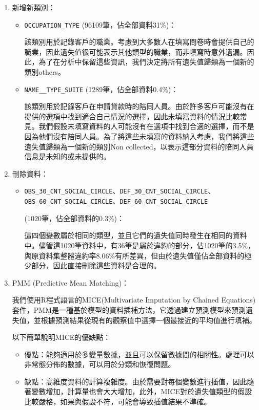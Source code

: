 \documentclass[12pt, a4paper]{article}
\begin{document}
\begin{enumerate}
\item 新增新類別：
\begin{itemize}

\item \verb|OCCUPATION_TYPE| (96109筆，佔全部資料31\%)：

該類別用於記錄客戶的職業。考慮到大多數人在填寫問卷時會提供自己的職業，因此遺失值很可能表示其他類型的職業，而非填寫時意外遺漏。因此，為了在分析中保留這些資訊，我們決定將所有遺失值歸類為一個新的類別others。

\item \verb|NAME__TYPE_SUITE| (1289筆，佔全部資料0.4\%)：

該類別用於記錄客戶在申請貸款時的陪同人員。由於許多客戶可能沒有在提供的選項中找到適合自己情況的選擇，因此未填寫資料的情況比較常見。我們假設未填寫資料的人可能沒有在選項中找到合適的選擇，而不是因為他們沒有陪同人員。為了將這些未填寫的資料納入考慮，我們將這些遺失值歸類為一個新的類別Non collected，以表示這部分資料的陪同人員信息是未知的或未提供的。

\end{itemize}

\item 刪除資料：

\begin{itemize}

\item \verb|OBS_30_CNT_SOCIAL_CIRCLE|、\verb|DEF_30_CNT_SOCIAL_CIRCLE|、\verb|OBS_60_CNT_SOCIAL_CIRCLE|、\verb|DEF_60_CNT_SOCIAL_CIRCLE|

(1020筆，佔全部資料的0.3\%)：

這四個變數屬於相同的類型，並且它們的遺失值同時發生在相同的資料中。儘管這1020筆資料中，有36筆是屬於違約的部分，佔1020筆的3.5\%，與原資料集整體違約率8.06\%有所差異，但由於遺失值僅佔全部資料的極少部分，因此直接刪除這些資料是合理的。

\end{itemize}

\item PMM (Predictive Mean Matching)：

我們使用R程式語言的MICE(Multivariate Imputation by Chained Equations)套件，PMM是一種基於模型的資料插補方法，它透過建立預測模型來預測遺失值，並根據預測結果從現有的觀察值中選擇一個最接近的平均值進行填補。

以下簡單說明MICE的優缺點：
\begin{itemize}
\item 優點：能夠適用於多變量數據，並且可以保留數據間的相關性。處理可以非常態分佈的數據，可以用於分類和恢復問題。
\item 缺點：高維度資料的計算複雜度。由於需要對每個變數進行插值，因此隨著變數增加，計算量也會大大增加，此外，MICE對於遺失值類型的假設比較嚴格，如果與假設不符，可能會導致插值結果不準確。
\end{itemize}


\end{enumerate}
\end{document}
